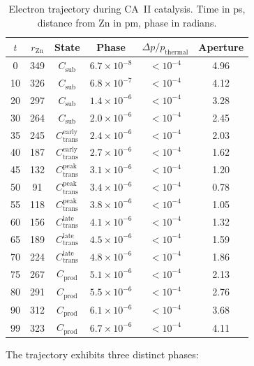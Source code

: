 \documentclass[twocolumn,amsmath,amssymb,aps,prb,superscriptaddress,longbibliography]{revtex4-2}
\begin{document}
\begin{table}[h]
\centering
\caption{Electron trajectory during CA~II catalysis. Time in ps, distance from Zn in pm, phase in radians.}
\label{tab:trajectory}
\begin{tabular}{cccccc}
\toprule
$t$ & $r_{\text{Zn}}$ & State & Phase & $\Delta p/p_{\text{thermal}}$ & Aperture \\
\midrule
0 & 349 & $C_{\text{sub}}$ & $6.7 \times 10^{-8}$ & $< 10^{-4}$ & 4.96 \\
10 & 326 & $C_{\text{sub}}$ & $6.8 \times 10^{-7}$ & $< 10^{-4}$ & 4.12 \\
20 & 297 & $C_{\text{sub}}$ & $1.4 \times 10^{-6}$ & $< 10^{-4}$ & 3.28 \\
30 & 264 & $C_{\text{sub}}$ & $2.0 \times 10^{-6}$ & $< 10^{-4}$ & 2.45 \\
35 & 245 & $C_{\text{trans}}^{\text{early}}$ & $2.4 \times 10^{-6}$ & $< 10^{-4}$ & 2.03 \\
40 & 187 & $C_{\text{trans}}^{\text{early}}$ & $2.7 \times 10^{-6}$ & $< 10^{-4}$ & 1.62 \\
45 & 132 & $C_{\text{trans}}^{\text{peak}}$ & $3.1 \times 10^{-6}$ & $< 10^{-4}$ & 1.20 \\
50 & 91 & $C_{\text{trans}}^{\text{peak}}$ & $3.4 \times 10^{-6}$ & $< 10^{-4}$ & 0.78 \\
55 & 118 & $C_{\text{trans}}^{\text{peak}}$ & $3.8 \times 10^{-6}$ & $< 10^{-4}$ & 1.05 \\
60 & 156 & $C_{\text{trans}}^{\text{late}}$ & $4.1 \times 10^{-6}$ & $< 10^{-4}$ & 1.32 \\
65 & 189 & $C_{\text{trans}}^{\text{late}}$ & $4.5 \times 10^{-6}$ & $< 10^{-4}$ & 1.59 \\
70 & 224 & $C_{\text{trans}}^{\text{late}}$ & $4.8 \times 10^{-6}$ & $< 10^{-4}$ & 1.86 \\
75 & 267 & $C_{\text{prod}}$ & $5.1 \times 10^{-6}$ & $< 10^{-4}$ & 2.13 \\
80 & 291 & $C_{\text{prod}}$ & $5.5 \times 10^{-6}$ & $< 10^{-4}$ & 2.76 \\
90 & 312 & $C_{\text{prod}}$ & $6.1 \times 10^{-6}$ & $< 10^{-4}$ & 3.68 \\
99 & 323 & $C_{\text{prod}}$ & $6.7 \times 10^{-6}$ & $< 10^{-4}$ & 4.11 \\
\bottomrule
\end{tabular}
\end{table}

The trajectory exhibits three distinct phases:
\end{document}
